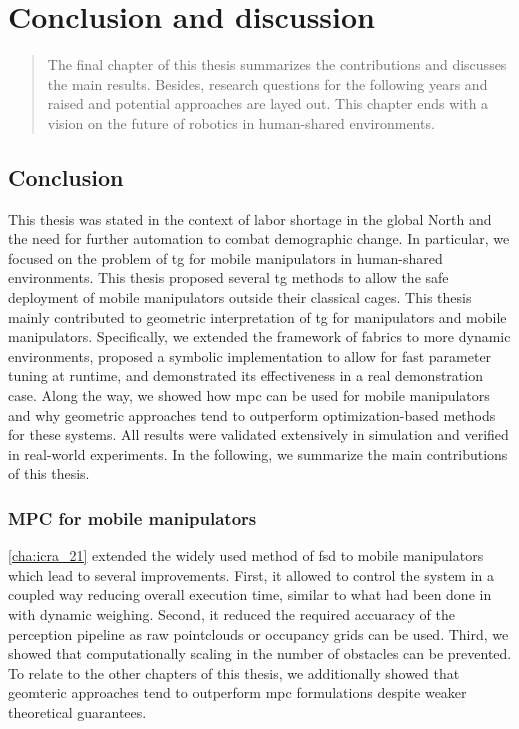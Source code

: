 \chapter{Conclusion and discussion}
\label{cha:conclusion}

\begin{abstract}
The final chapter of this thesis summarizes the contributions and discusses the
main results. Besides, research questions for the following years and raised and
potential approaches are layed out. This chapter ends with a vision on the
future of robotics in human-shared environments.
\end{abstract}

\newpage

\section{Conclusion}
\label{sec:conclusion}

This thesis was stated in the context of labor shortage in the global North and
the need for further automation to combat demographic change. In particular, we
focused on the problem of \ac{tg} for mobile manipulators in human-shared
environments. This thesis proposed several \ac{tg} methods to allow the safe
deployment of mobile manipulators outside their classical cages.
This thesis mainly contributed to geometric interpretation of \ac{tg} for
manipulators and mobile manipulators. Specifically, we extended the framework of
\ac{fabrics} to more dynamic environments, proposed a symbolic implementation to
allow for fast parameter tuning at runtime, and demonstrated its effectiveness
in a real demonstration case. Along the way, we showed how \ac{mpc} can be used
for mobile manipulators and why geometric approaches tend to outperform
optimization-based methods for these systems. All results were validated
extensively in simulation and verified in real-world experiments. In the
following, we summarize the main contributions of this thesis.

\subsection{MPC for mobile manipulators}
\label{sec:conclusion_mpc}

\cref{cha:icra_21} extended the widely used method of \ac{fsd} to mobile
manipulators which lead to several improvements. First, it allowed to control
the system in a coupled way reducing overall execution time, similar to what had
been done in \cite{Avanzini2018} with dynamic weighing. Second, it reduced the
required accuaracy of the perception pipeline as raw pointclouds or occupancy
grids can be used. Third, we showed that computationally scaling in the number
of obstacles can be prevented. To relate to the other chapters of this thesis,
we additionally showed that geomteric approaches tend to outperform \ac{mpc}
formulations despite weaker theoretical guarantees.

